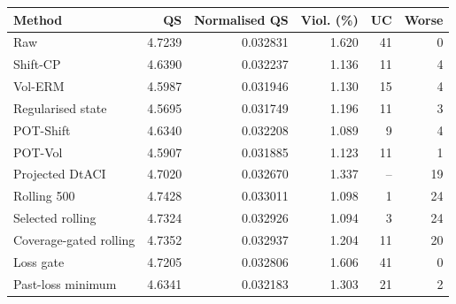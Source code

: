 \begin{tabular}{lrrrrr}
\toprule
Method & QS & Normalised QS & Viol. (\%) & UC & Worse \\
\midrule
Raw & 4.7239 & 0.032831 & 1.620 & 41 & 0 \\
Shift-CP & 4.6390 & 0.032237 & 1.136 & 11 & 4 \\
Vol-ERM & 4.5987 & 0.031946 & 1.130 & 15 & 4 \\
Regularised state & 4.5695 & 0.031749 & 1.196 & 11 & 3 \\
POT-Shift & 4.6340 & 0.032208 & 1.089 & 9 & 4 \\
POT-Vol & 4.5907 & 0.031885 & 1.123 & 11 & 1 \\
Projected DtACI & 4.7020 & 0.032670 & 1.337 & -- & 19 \\
Rolling 500 & 4.7428 & 0.033011 & 1.098 & 1 & 24 \\
Selected rolling & 4.7324 & 0.032926 & 1.094 & 3 & 24 \\
Coverage-gated rolling & 4.7352 & 0.032937 & 1.204 & 11 & 20 \\
Loss gate & 4.7205 & 0.032806 & 1.606 & 41 & 0 \\
Past-loss minimum & 4.6341 & 0.032183 & 1.303 & 21 & 2 \\
\bottomrule
\end{tabular}
